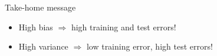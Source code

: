 \documentclass[xcolor={usenames,dvipsnames},handout]{beamer}
\begin{document}
\begin{frame}{}

\begin{exampleblock}{\Large Take-home message}
{\Large
\begin{itemize}
\item   High bias $\Longrightarrow$ high training and test errors!
\item   High variance $\Longrightarrow$ low training error, high test errors!
\end{itemize}}
\end{exampleblock}

\end{frame}

% 
%
%

\end{document}
